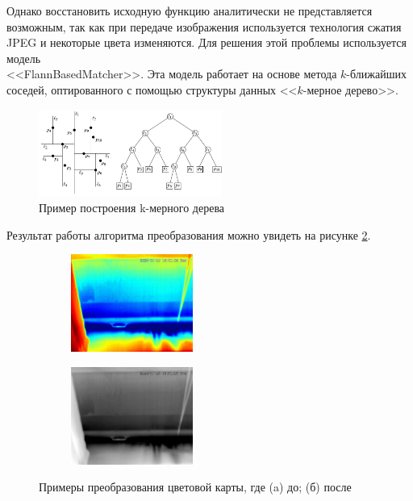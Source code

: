 \documentclass[t]{beamer}
\begin{document}
	\begin{frame}
		Однако восстановить исходную функцию аналитически не представляется возможным, так как при передаче изображения используется технология сжатия JPEG и некоторые цвета изменяются. Для решения этой проблемы используется модель \\ <<FlannBasedMatcher>>. Эта модель работает на основе метода $k$-ближайших соседей, оптированного с помощью структуры данных <<$k$-мерное дерево>>.
		\begin{figure}[h!]
			\centering
			\includegraphics[width = 6cm]{image/chapter_2/kdtreeexample}	
			\caption{Пример построения k-мерного дерева}
			\label{fig:kdtreeexample}
		\end{figure}
		
	\end{frame}
	
	\begin{frame}
		Результат работы алгоритма преобразования можно увидеть на рисунке \ref{fig:ResKNN}.
		\begin{figure}[ht!]
			\begin{subfigure}{.45\textwidth}
				\centering
				\includegraphics[width = 4cm]{image/chapter_2/tep_example}
				\caption{}
			\end{subfigure}
			\begin{subfigure}{.45\textwidth}
				\centering
				\includegraphics[width = 4cm]{image/chapter_2/gray_tep_example}
				\caption{}
			\end{subfigure}
			\centering
			\caption{Примеры преобразования цветовой карты, где (a) до; (б) после}
			\label{fig:ResKNN}
		\end{figure}
	\end{frame}
\end{document}

